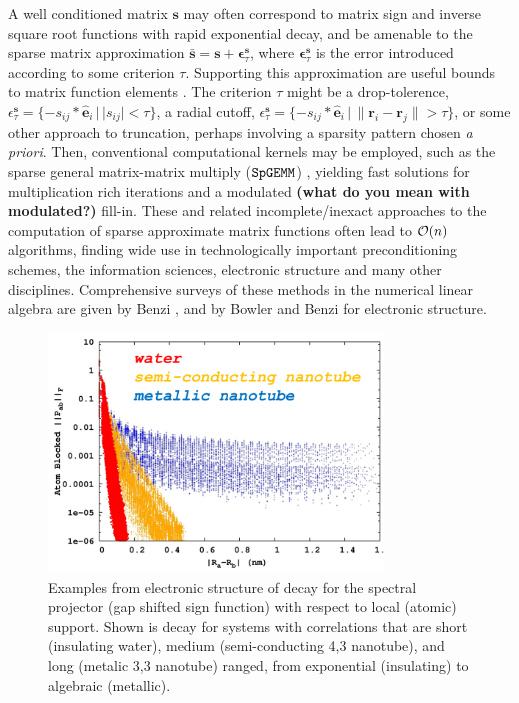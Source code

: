 \documentclass[letterpaper,twocolumn,amsmath,amsfont,amssymb,english,aps,jcp,preprintnumbers,groupaddress,nofootinbib,tightenlines,floatfix]{revtex4}
\newcommand{\mat}[1]{\boldsymbol{#1}}
\theoremstyle{plain}
\theoremstyle{remark}
\theoremstyle{plain}
\begin{document}
A well conditioned matrix $\mat{s}$ may often correspond to matrix
sign and inverse square root functions with rapid exponential decay,
and be amenable to the sparse matrix approximation
$\bar{\mat{s}} = \mat{s}+ \mat{\epsilon}^{\mat{s}}_\tau$,
where $\mat{\epsilon}^{\mat{s}}_\tau$ is the error introduced
according to some criterion $\tau$.  Supporting this approximation are
useful bounds to matrix function elements \cite{Benzi99b, }.
The criterion $\tau$ might be a drop-tolerence,
$\epsilon^{\mat{s}}_{\tau} = \{-s_{ij}*\hat{\mat{e}}_i \, | \, |s_{ij}|<\tau \}$,
a radial cutoff,
$\epsilon^{\mat{s}}_{\tau} = \{-s_{ij}*\hat{\mat{e}}_i \, | \, \lVert \mat{r}_i - \mat{r}_j \rVert > \tau \}$,
or some other approach to truncation, perhaps involving a sparsity
pattern chosen {\em a priori}.
Then, conventional computational kernels may be employed, such as the
sparse general matrix-matrix multiply ($\tt{SpGEMM}$)
\cite{Gustavson78, Toledo97, challacombe00, bowler00}, yielding fast
solutions for multiplication rich iterations and a modulated {\bf
  (what do you mean with modulated?)} fill-in.
These and related incomplete/inexact approaches to the computation of
sparse approximate matrix functions often lead to ${\cal O}(n)$
algorithms, finding wide use in technologically important
preconditioning schemes, the information sciences, electronic
structure and many other disciplines. Comprehensive surveys of these
methods in the numerical linear algebra are given by Benzi
\cite{Benzi99,Benzi02}, and by Bowler \cite{Bowler12} and Benzi \cite{Benzi13}
for electronic structure.

\begin{figure}[t]\label{figure1}
 \includegraphics[width=3.5in]{decay_picture.png}
  \caption{Examples from electronic structure of decay for the
    spectral projector (gap shifted sign function) with respect to
    local (atomic) support.  Shown is decay for systems with
    correlations that are short (insulating water), medium
    (semi-conducting 4,3 nanotube), and long (metalic 3,3 nanotube)
    ranged, from exponential (insulating) to algebraic (metallic). }
\end{figure}
\end{document}
